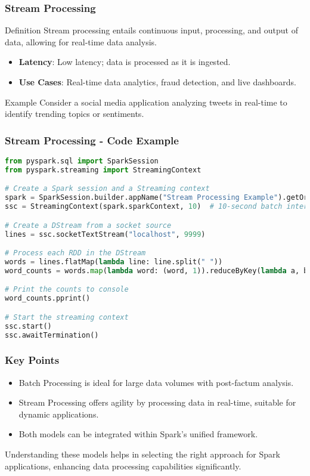 \documentclass[aspectratio=169]{beamer}
\begin{document}
\begin{frame}
    \frametitle{Stream Processing}
    \begin{block}{Definition}
        Stream processing entails continuous input, processing, and output of 
        data, allowing for real-time data analysis.
    \end{block}
    
    \begin{itemize}
        \item \textbf{Latency}: Low latency; data is processed as it is ingested.
        \item \textbf{Use Cases}: Real-time data analytics, fraud detection, 
        and live dashboards.
    \end{itemize}
    
    \begin{block}{Example}
        Consider a social media application analyzing tweets in real-time 
        to identify trending topics or sentiments.
    \end{block}
\end{frame}

\begin{frame}[fragile]
    \frametitle{Stream Processing - Code Example}
    \begin{lstlisting}[language=Python,backgroundcolor=\color{lightgray}]
from pyspark.sql import SparkSession
from pyspark.streaming import StreamingContext

# Create a Spark session and a Streaming context
spark = SparkSession.builder.appName("Stream Processing Example").getOrCreate()
ssc = StreamingContext(spark.sparkContext, 10)  # 10-second batch interval

# Create a DStream from a socket source
lines = ssc.socketTextStream("localhost", 9999)

# Process each RDD in the DStream
words = lines.flatMap(lambda line: line.split(" "))
word_counts = words.map(lambda word: (word, 1)).reduceByKey(lambda a, b: a + b)

# Print the counts to console
word_counts.pprint()

# Start the streaming context
ssc.start()
ssc.awaitTermination()
    \end{lstlisting}
\end{frame}

\begin{frame}
    \frametitle{Key Points}
    \begin{itemize}
        \item Batch Processing is ideal for large data volumes with 
        post-factum analysis.
        \item Stream Processing offers agility by processing data in  
        real-time, suitable for dynamic applications.
        \item Both models can be integrated within Spark’s unified framework.
    \end{itemize}
    Understanding these models helps in selecting the right approach for  
    Spark applications, enhancing data processing capabilities significantly.
\end{frame}
\end{document}
